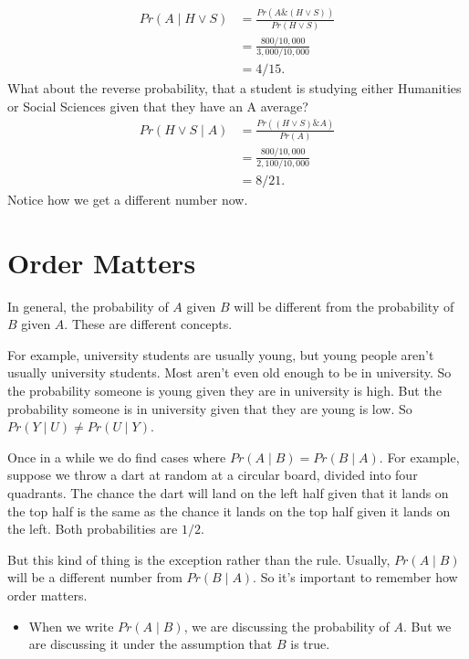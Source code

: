\documentclass[justified]{tufte-book}
\newcommand{\given}{\mid}
\renewcommand{\wedge}{\mathbin{\&}}
\newcommand{\p}{Pr}
\newenvironment{warning}{\begin{itemize}\item[\faBan]}{\end{itemize}}
\theoremstyle{definition}
\theoremstyle{definition}
\theoremstyle{definition}
\theoremstyle{definition}
\theoremstyle{remark}
\begin{document}
\[
  \begin{aligned}
    \p(A \given H \vee S) &= \frac{\p(A \wedge (H \vee S))}{\p(H \vee S)}\\
                           &= \frac{800/10,000}{3,000/10,000}\\
                           &= 4/15.
  \end{aligned}
\]
What about the reverse probability, that a student is studying either Humanities or Social Sciences given that they have an A average?
\[
  \begin{aligned}
    \p(H \vee S \given A) &= \frac{\p((H \vee S) \wedge A)}{\p(A)}\\
                           &= \frac{800/10,000}{2,100/10,000}\\
                           &= 8/21.
  \end{aligned}
\]
Notice how we get a different number now.

\hypertarget{order-matters}{%
\section{Order Matters}\label{order-matters}}

In general, the probability of \(A\) given \(B\) will be different from the probability of \(B\) given \(A\). These are different concepts.

For example, university students are usually young, but young people aren't usually university students. Most aren't even old enough to be in university. So the probability someone is young given they are in university is high. But the probability someone is in university given that they are young is low. So \(\p(Y \given U) \neq \p(U \given Y)\).

Once in a while we do find cases where \(\p(A \given B) = \p(B \given A)\). For example, suppose we throw a dart at random at a circular board, divided into four quadrants. The chance the dart will land on the left half given that it lands on the top half is the same as the chance it lands on the top half given it lands on the left. Both probabilities are \(1/2\).

But this kind of thing is the exception rather than the rule. Usually, \(\p(A \given B)\) will be a different number from \(\p(B \given A)\). So it's important to remember how order matters.

\begin{warning}
When we write \(\p(A \given B)\), we are discussing the probability of
\(A\). But we are discussing it under the assumption that \(B\) is true.
\end{warning}
\end{document}
